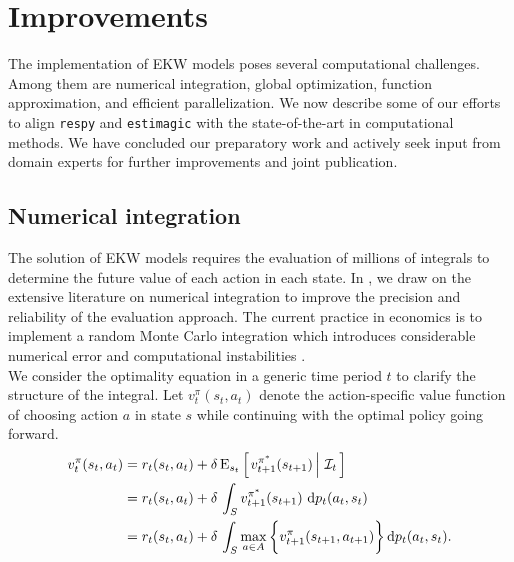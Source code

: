 \section{Improvements}\label{Computation}
The implementation of EKW models poses several computational challenges. Among them are numerical integration, global optimization, function approximation, and efficient parallelization. We now describe some of our efforts to align \verb+respy+ and \verb+estimagic+ with the state-of-the-art in computational methods. We have concluded our preparatory work and actively seek input from domain experts for further improvements and joint publication.
\subsection{Numerical integration}
The solution of EKW models requires the evaluation of millions of integrals to determine the future value of each action in each state. In \citet{Gabler.2020a}, we draw on the extensive literature on numerical integration \citep{Davis.2007, Gerstner.1998} to improve the precision and reliability of the evaluation approach. The current practice in economics is to implement a random Monte Carlo integration which introduces considerable numerical error and computational instabilities \citep{Judd.2011}.\\

\noindent We consider the optimality equation in a generic time period $t$ to clarify the structure of the integral. Let $v^{\pi}_{t}(s_t, a_t)$ denote the action-specific value function of choosing action $a$ in state $s$ while continuing with the optimal policy going forward.
%
\begin{align*}
v^{\pi}_{t}(s_t, a_t) & = r_t(s_t, a_t) + \delta\,\mathrm{E}_{s_t} \left[\left.v^{\pi^*}_{t + 1}(s_{t + 1})\,\right\vert\,\mathcal{I}_t\,\right] \\
& =  r_t(s_t, a_t) + \delta\, \int_S v^{\pi^*}_{t + 1}(s_{t + 1})\, \mathop{}\!\mathrm{d} p_t(a_t, s_t)\\
& =  r_t(s_t, a_t) + \delta\, \int_S \max_{a \in A}\bigg\{v^\pi_{t + 1}(s_{t + 1}, a_{t + 1})\bigg\}\mathop{}\!\mathrm{d} p_t(a_t, s_t).
\end{align*}

